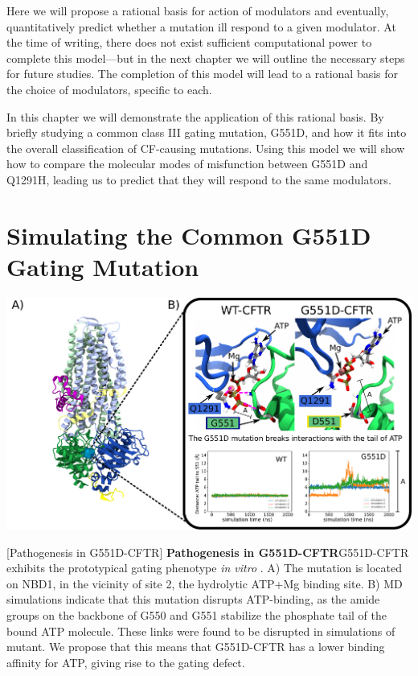 Here we will propose a rational basis for action of modulators and eventually, quantitatively predict whether a mutation ill respond to a given modulator. At the time of writing, there does not exist sufficient computational power to complete this model---but in the next chapter we will outline the necessary steps for future studies. The completion of this model will lead to a rational basis for the choice of modulators, specific to each. 

In this chapter we will demonstrate the application of this rational basis. By briefly studying a common class III gating mutation, G551D, and how it fits into the overall classification of CF-causing mutations. Using this model we will show how to compare the molecular modes of misfunction between G551D and Q1291H, leading us to predict that they will respond to the same modulators. 

\section{Simulating the Common G551D Gating Mutation}

	\begin{center}
		\includegraphics[width=\textwidth]{figures/perspective/G551D.pdf}
	\end{center}

\begingroup
\captionsetup{singlelinecheck = false, justification=raggedright}
[Pathogenesis in G551D-CFTR] {\textbf{Pathogenesis in G551D-CFTR}}{G551D-CFTR exhibits the prototypical gating phenotype \textit{in vitro} \cite{bompadre2007, wang2020}. A) The mutation is located on NBD1, in the vicinity of site 2, the hydrolytic ATP+Mg binding site. B) MD simulations indicate that this mutation disrupts ATP-binding, as the amide groups on the backbone of G550 and G551 stabilize the phosphate tail of the bound ATP molecule. These links were found to be disrupted in simulations of mutant. We propose that this means that G551D-CFTR has a lower binding affinity for ATP, giving rise to the gating defect.} 
\label{G551D_results}
\endgroup

